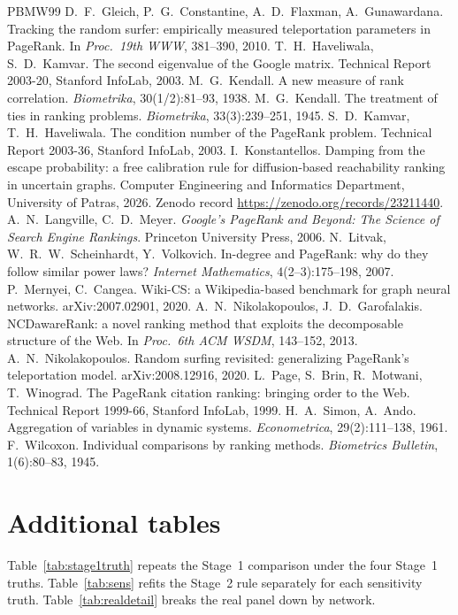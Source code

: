 \documentclass[11pt,a4paper]{article}
\theoremstyle{definition}
\theoremstyle{remark}
\begin{document}
\begin{thebibliography}{PBMW99}
 D.~F.~Gleich, P.~G.~Constantine, A.~D.~Flaxman, A.~Gunawardana. Tracking the random
surfer: empirically measured teleportation parameters in PageRank. In \emph{Proc.\ 19th WWW}, 381--390,
2010.
 T.~H.~Haveliwala, S.~D.~Kamvar. The second eigenvalue of the Google matrix.
Technical Report 2003-20, Stanford InfoLab, 2003.
 M.~G.~Kendall. A new measure of rank correlation. \emph{Biometrika}, 30(1/2):81--93,
1938.
 M.~G.~Kendall. The treatment of ties in ranking problems. \emph{Biometrika},
33(3):239--251, 1945.
 S.~D.~Kamvar, T.~H.~Haveliwala. The condition number of the PageRank problem.
Technical Report 2003-36, Stanford InfoLab, 2003.
 I.~Konstantellos. Damping from the escape probability: a free calibration
rule for diffusion-based reachability ranking in uncertain graphs. Computer Engineering and Informatics
Department, University of Patras, 2026. Zenodo record \url{https://zenodo.org/records/23211440}.
 A.~N.~Langville, C.~D.~Meyer. \emph{Google's PageRank and Beyond: The Science of
Search Engine Rankings}. Princeton University Press, 2006.
 N.~Litvak, W.~R.~W.~Scheinhardt, Y.~Volkovich. In-degree and PageRank: why do they
follow similar power laws? \emph{Internet Mathematics}, 4(2--3):175--198, 2007.
 P.~Mernyei, C.~Cangea. Wiki-CS: a Wikipedia-based benchmark for graph neural
networks. arXiv:2007.02901, 2020.
 A.~N.~Nikolakopoulos, J.~D.~Garofalakis. NCDawareRank: a novel ranking method that
exploits the decomposable structure of the Web. In \emph{Proc.\ 6th ACM WSDM}, 143--152, 2013.
 A.~N.~Nikolakopoulos. Random surfing revisited: generalizing PageRank's teleportation
model. arXiv:2008.12916, 2020.
 L.~Page, S.~Brin, R.~Motwani, T.~Winograd. The PageRank citation ranking: bringing order
to the Web. Technical Report 1999-66, Stanford InfoLab, 1999.
 H.~A.~Simon, A.~Ando. Aggregation of variables in dynamic systems. \emph{Econometrica},
29(2):111--138, 1961.
 F.~Wilcoxon. Individual comparisons by ranking methods. \emph{Biometrics Bulletin},
1(6):80--83, 1945.
\end{thebibliography}

\FloatBarrier
\appendix
\section{Additional tables}
\label{app:tables}
Table~\ref{tab:stage1truth} repeats the Stage~1 comparison under the four Stage~1 truths.
Table~\ref{tab:sens} refits the Stage~2 rule separately for each sensitivity truth.
Table~\ref{tab:realdetail} breaks the real panel down by network.




\end{document}
